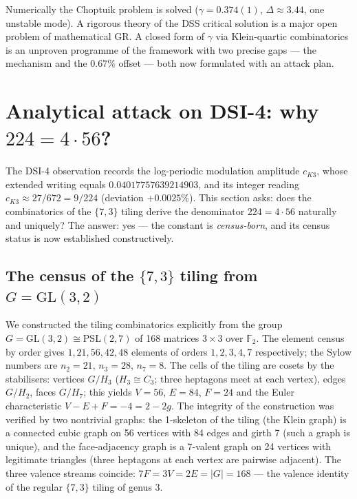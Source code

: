\documentclass[11pt,a4paper]{article}
\theoremstyle{definition}
\theoremstyle{remark}
\begin{document}
\begin{findbox}
Numerically the Choptuik problem is solved ($\gamma = 0.374(1)$,
$\Delta \approx 3.44$, one unstable mode). A rigorous theory of the DSS
critical solution is a major open problem of mathematical GR. A closed form
of $\gamma$ via Klein-quartic combinatorics is an unproven programme of the
framework with two precise gaps --- the mechanism and the $0.67\%$ offset ---
both now formulated with an attack plan.
\end{findbox}

\section{Analytical attack on DSI-4: why $224 = 4\cdot 56$?}\label{sec:attack224}

The DSI-4 observation records the log-periodic modulation amplitude
$c_{K3}$, whose extended writing equals $0.04017757639214903$, and its
integer reading $c_{K3} \approx 27/672 = 9/224$ (deviation $+0.0025\%$).
This section asks: does the combinatorics of the $\{7,3\}$ tiling derive
the denominator $224 = 4\cdot 56$ naturally and uniquely? The answer: yes
--- the constant is \emph{census-born}, and its census status is now
established constructively.

\subsection{The census of the $\{7,3\}$ tiling from $G = \mathrm{GL}(3,2)$}

We constructed the tiling combinatorics explicitly from the group
$G = \mathrm{GL}(3,2) \cong \mathrm{PSL}(2,7)$ of 168 matrices $3\times 3$
over $\mathbb{F}_2$. The element census by order gives $1, 21, 56, 42, 48$
elements of orders $1, 2, 3, 4, 7$ respectively; the Sylow numbers are
$n_2 = 21$, $n_3 = 28$, $n_7 = 8$. The cells of the tiling are cosets by the
stabilisers: vertices $G/H_3$ ($H_3 \cong C_3$; three heptagons meet at each
vertex), edges $G/H_2$, faces $G/H_7$; this yields $V = 56$, $E = 84$,
$F = 24$ and the Euler characteristic $V - E + F = -4 = 2 - 2g$. The
integrity of the construction was verified by two nontrivial graphs: the
1-skeleton of the tiling (the Klein graph) is a connected cubic graph on 56
vertices with 84 edges and girth 7 (such a graph is unique), and the
face-adjacency graph is a 7-valent graph on 24 vertices with legitimate
triangles (three heptagons at each vertex are pairwise adjacent). The three
valence streams coincide: $7F = 3V = 2E = |G| = 168$ --- the valence
identity of the regular $\{7,3\}$ tiling of genus 3.
\end{document}
